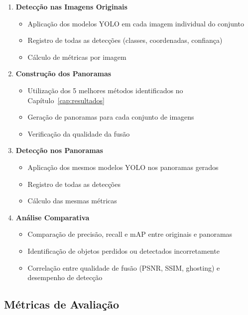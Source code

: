\begin{enumerate}
    \item \textbf{Detecção nas Imagens Originais}
    \begin{itemize}
        \item Aplicação dos modelos YOLO em cada imagem individual do conjunto
        \item Registro de todas as detecções (classes, coordenadas, confiança)
        \item Cálculo de métricas por imagem
    \end{itemize}

    \item \textbf{Construção dos Panoramas}
    \begin{itemize}
        \item Utilização dos 5 melhores métodos identificados no Capítulo~\ref{cap:resultados}
        \item Geração de panoramas para cada conjunto de imagens
        \item Verificação da qualidade da fusão
    \end{itemize}

    \item \textbf{Detecção nos Panoramas}
    \begin{itemize}
        \item Aplicação dos mesmos modelos YOLO nos panoramas gerados
        \item Registro de todas as detecções
        \item Cálculo das mesmas métricas
    \end{itemize}

    \item \textbf{Análise Comparativa}
    \begin{itemize}
        \item Comparação de precisão, recall e mAP entre originais e panoramas
        \item Identificação de objetos perdidos ou detectados incorretamente
        \item Correlação entre qualidade de fusão (PSNR, SSIM, ghosting) e desempenho de detecção
    \end{itemize}
\end{enumerate}

\subsection{Métricas de Avaliação}

